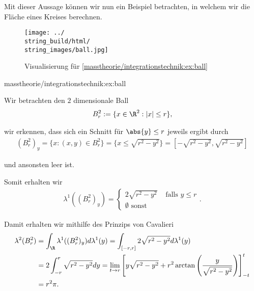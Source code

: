 \documentclass[letterpaper,10pt,german]{jupyterBook}
\begin{document}
\par
Mit dieser Aussage können wir nun ein Beispiel betrachten, in welchem wir die Fläche eines Kreises berechnen.

\begin{figure}[htbp]
\centering


\noindent\texttt{[image: ../\\string\_build/html/\\string\_images/ball.jpg]}
\caption{Visualisierung für \cref{masstheorie/integrationstechnik:ex:ball} }\label{\detokenize{masstheorie/integrationstechnik:fig-ball}}\end{figure}
\begin{example}{}{masstheorie/integrationstechnik:ex:ball}



\par
Wir betrachten den \(2\) dimensionale Ball
\begin{align*}
B_r^2:=\{x\in\R^2: |x|\leq r\},
\end{align*}
\par
wir erkennen, dass sich ein Schnitt für \(\abs{y}\leq r\) jeweils ergibt durch
\begin{align*}
(B_r^2)_y = \{x:(x,y)\in B_r^2\} = \{x\leq\sqrt{r^2-y^2}\} = [-\sqrt{r^2-y^2},\sqrt{r^2-y^2}]
\end{align*}
\par
und ansonsten leer ist.

\par
Somit erhalten wir
\begin{align*}
\lambda^1((B_r^2)_y) = 
\begin{cases}
2 \sqrt{r^2-y^2}&\text{ falls }y\leq r\\
\emptyset\text{ sonst}
\end{cases}.
\end{align*}
\par
Damit erhalten wir mithilfe des Prinzips von Cavalieri
\begin{align*}
\lambda^2(B_r^2) &= \int_{\R} \lambda^1((B_r^2)_y) d\lambda^1(y) = 
\int_{[-r,r]} 2 \sqrt{r^2-y^2} d\lambda^1(y)\\
&= 
2\int_{-r}^r \sqrt{r^2 - y^2} dy = 
\lim_{t\to r}\left[y \sqrt{r^2-y^2} +r^2\arctan\left(\frac{y}{\sqrt{r^2-y^2}}\right)\right]^t_{-t}\\
&=
r^2\pi.
\end{align*}\end{example}
\end{document}
